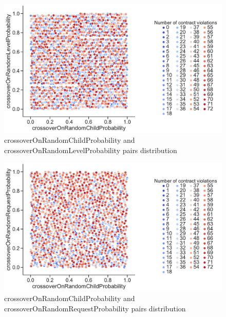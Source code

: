 \begin{figure}
	\centering
	\includegraphics[width=\textwidth]{images/PairsDistr/crossoverOnRandomChildProbability_crossoverOnRandomLevelProbability.pdf}
	\caption[crossoverOnRandomChildProbability and crossoverOnRandomLevelProbability pairs distribution]{crossoverOnRandomChildProbability and crossoverOnRandomLevelProbability pairs distribution}
	\label{fig:crossoverOnRandomChildProbability_crossoverOnRandomLevelProbability_pair}
\end{figure}
\begin{figure}
	\centering
	\includegraphics[width=\textwidth]{images/PairsDistr/crossoverOnRandomChildProbability_crossoverOnRandomRequestProbability.pdf}
	\caption[crossoverOnRandomChildProbability and crossoverOnRandomRequestProbability pairs distribution]{crossoverOnRandomChildProbability and crossoverOnRandomRequestProbability pairs distribution}
	\label{fig:crossoverOnRandomChildProbability_crossoverOnRandomRequestProbability_pair}
\end{figure}
